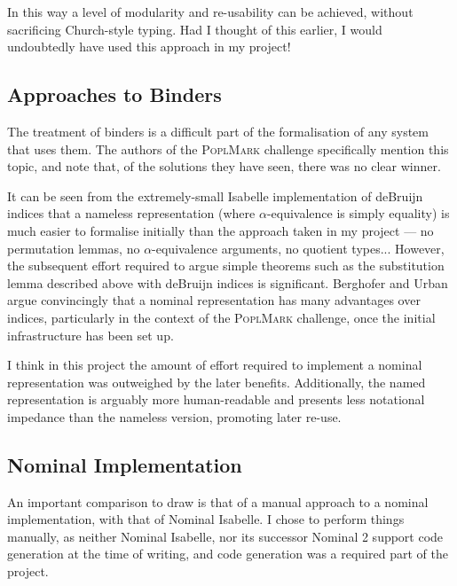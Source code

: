In this way a level of modularity and re-usability can be achieved, without sacrificing Church-style typing.
Had I thought of this earlier, I would undoubtedly have used this approach in my project!

\subsection{Approaches to Binders}
The treatment of binders is a difficult part of the formalisation of any system that uses them.
The authors of the \textsc{PoplMark} challenge\cite{poplmark} specifically mention this topic, and note that, of the solutions they have seen, there was no clear winner.

It can be seen from the extremely-small Isabelle implementation of deBruijn indices that a nameless representation (where \(\alpha\)-equivalence is simply equality) is much easier to formalise initially than the approach taken in my project --- no permutation lemmas, no \(\alpha\)-equivalence arguments, no quotient types...
However, the subsequent effort required to argue simple theorems such as the substitution lemma described above with deBruijn indices is significant.
Berghofer and Urban argue convincingly\cite{head-to-head} that a nominal representation has many advantages over indices, particularly in the context of the \textsc{PoplMark} challenge, once the initial infrastructure has been set up.

I think in this project the amount of effort required to implement a nominal representation was outweighed by the later benefits.
Additionally, the named representation is arguably more human-readable and presents less notational impedance than the nameless version, promoting later re-use.

\subsection{Nominal Implementation}
An important comparison to draw is that of a manual approach to a nominal implementation, with that of Nominal Isabelle.
I chose to perform things manually, as neither Nominal Isabelle, nor its successor Nominal 2 support code generation at the time of writing, and code generation was a required part of the project.

